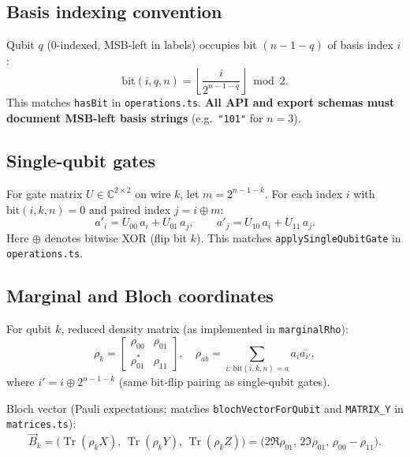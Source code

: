 \documentclass[11pt,a4paper]{article}
\newcommand{\C}{\mathbb{C}}
\newcommand{\Tr}{\operatorname{Tr}}
\newcommand{\xor}{\oplus}
\begin{document}
\subsection{Basis indexing convention}

Qubit $q$ (0-indexed, MSB-left in labels) occupies bit $(n-1-q)$ of basis index $i$:
\begin{equation}
  \mathrm{bit}(i,q,n) = \left\lfloor \frac{i}{2^{n-1-q}} \right\rfloor \bmod 2.
\end{equation}
This matches \texttt{hasBit} in \texttt{operations.ts}. \textbf{All API and export schemas must document MSB-left basis strings} (e.g.\ \texttt{"101"} for $n=3$).

\subsection{Single-qubit gates}

For gate matrix $U\in\C^{2\times 2}$ on wire $k$, let $m=2^{n-1-k}$. For each index $i$ with $\mathrm{bit}(i,k,n)=0$ and paired index $j=i\xor m$:
\begin{equation}
  a'_i = U_{00}\,a_i + U_{01}\,a_j, \qquad
  a'_j = U_{10}\,a_i + U_{11}\,a_j.
\end{equation}
Here $\xor$ denotes bitwise XOR (flip bit $k$). This matches \texttt{applySingleQubitGate} in \texttt{operations.ts}.

\subsection{Marginal and Bloch coordinates}

For qubit $k$, reduced density matrix (as implemented in \texttt{marginalRho}):
\begin{equation}
  \rho_k = \begin{bmatrix}
    \rho_{00} & \rho_{01} \\
    \rho_{01}^* & \rho_{11}
  \end{bmatrix}, \quad
  \rho_{ab} = \sum_{i:\,\mathrm{bit}(i,k,n)=a} a_i \overline{a_{i'}},
\end{equation}
where $i' = i \xor 2^{n-1-k}$ (same bit-flip pairing as single-qubit gates).

Bloch vector (Pauli expectations; matches \texttt{blochVectorForQubit} and \texttt{MATRIX\_Y} in \texttt{matrices.ts}):
\begin{equation}
  \vec{B}_k = \bigl(\Tr(\rho_k X),\, \Tr(\rho_k Y),\, \Tr(\rho_k Z)\bigr)
  = \bigl(2\Re\rho_{01},\, 2\Im\rho_{01},\, \rho_{00}-\rho_{11}\bigr).
\end{equation}
\end{document}
